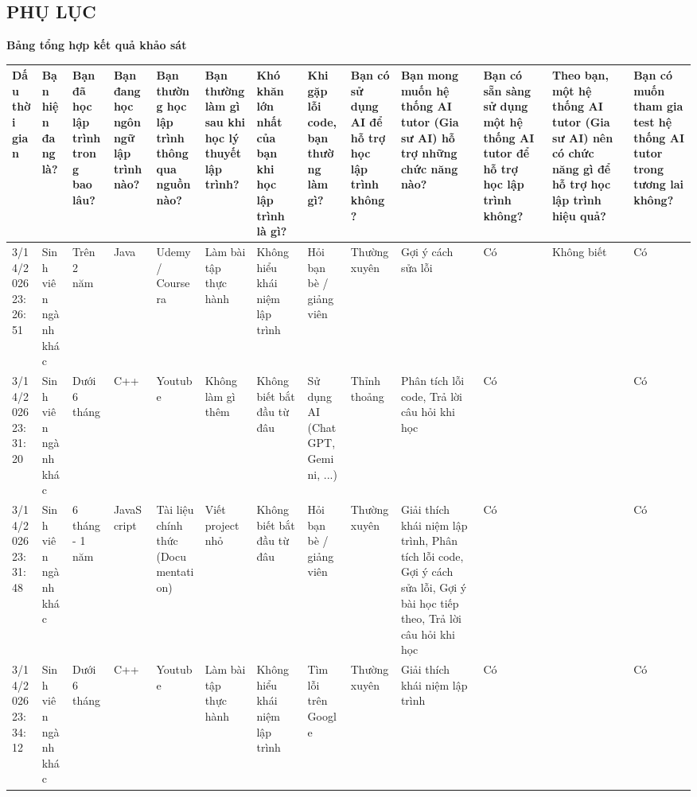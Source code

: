 \documentclass[../main.tex]{subfiles}
\begin{document}
\begin{landscape}

\chapter*{PHỤ LỤC}

\noindent\textbf{Bảng tổng hợp kết quả khảo sát}

\tiny
{
\renewcommand{\arraystretch}{1.5}
\begin{tabularx}{\textwidth}{|p{1cm}|p{1.50cm}|p{1.35cm}|p{1.3cm}|p{1.50cm}|p{1.55cm}|p{1.55cm}|p{1.55cm}|p{1.55cm}|p{2.50cm}|p{1.55cm}|p{1.55cm}|p{1.55cm}|}
\hline
\textbf{Dấu thời gian} & \textbf{Bạn hiện đang là?} & \textbf{Bạn đã học lập trình trong bao lâu?} & \textbf{Bạn đang học ngôn ngữ lập trình nào?} & \textbf{Bạn thường học lập trình thông qua nguồn nào?} & \textbf{Bạn thường làm gì sau khi học lý thuyết lập trình?} & \textbf{Khó khăn lớn nhất của bạn khi học lập trình là gì?} & \textbf{Khi gặp lỗi code, bạn thường làm gì?} & \textbf{Bạn có sử dụng AI để hỗ trợ học lập trình không?} & \textbf{Bạn mong muốn hệ thống AI tutor (Gia sư AI) hỗ trợ những chức năng nào?} & \textbf{Bạn có sẵn sàng sử dụng một hệ thống AI tutor để hỗ trợ học lập trình không?} & \textbf{Theo bạn, một hệ thống AI tutor (Gia sư AI) nên có chức năng gì để hỗ trợ học lập trình hiệu quả?} & \textbf{Bạn có muốn tham gia test hệ thống AI tutor trong tương lai không?} \\
\hline
3/14/2026 23:26:51 & Sinh viên ngành khác & Trên 2 năm & Java & Udemy / Coursera & Làm bài tập thực hành & Không hiểu khái niệm lập trình & Hỏi bạn bè / giảng viên & Thường xuyên & Gợi ý cách sửa lỗi & Có & Không biết & Có \\
\hline
3/14/2026 23:31:20 & Sinh viên ngành khác & Dưới 6 tháng & C++ & Youtube & Không làm gì thêm & Không biết bắt đầu từ đâu & Sử dụng AI (ChatGPT, Gemini, ...) & Thỉnh thoảng & Phân tích lỗi code, Trả lời câu hỏi khi học & Có &  & Có \\
\hline
3/14/2026 23:31:48 & Sinh viên ngành khác & 6 tháng - 1 năm & JavaScript & Tài liệu chính thức (Documentation) & Viết project nhỏ & Không biết bắt đầu từ đâu & Hỏi bạn bè / giảng viên & Thường xuyên & Giải thích khái niệm lập trình, Phân tích lỗi code, Gợi ý cách sửa lỗi, Gợi ý bài học tiếp theo, Trả lời câu hỏi khi học & Có &  & Có \\
\hline
3/14/2026 23:34:12 & Sinh viên ngành khác & Dưới 6 tháng & C++ & Youtube & Làm bài tập thực hành & Không hiểu khái niệm lập trình & Tìm lỗi trên Google & Thường xuyên & Giải thích khái niệm lập trình & Có &  & Có \\

\end{tabularx}}
\end{landscape}
\end{document}
